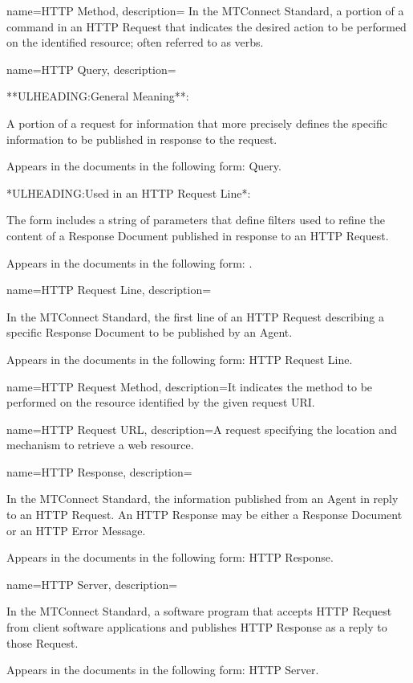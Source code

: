 {
    name={HTTP Method},
	description={
	In the MTConnect Standard, a portion of a command in an \gls{HTTP Request} that indicates the desired action to be performed on the identified resource; often referred to as verbs.
}
}

{
    name={HTTP Query},
	description={
	**ULHEADING:General Meaning**:

	A portion of a request for information that more precisely defines the specific information to be published in response to the request. 

	Appears in the documents in the following form: \gls{Query}.

	*ULHEADING:Used in an \gls{HTTP Request Line}*:

	The form  includes a string of parameters that define filters used to refine the content of a \gls{Response Document} published in response to an \gls{HTTP Request}.

	Appears in the documents in the following form: .
}
}

{
    name={HTTP Request Line},
	description={
	In the MTConnect Standard, the first line of an \gls{HTTP Request} describing a specific \gls{Response Document} to be published by an \gls{Agent}.

	Appears in the documents in the following form: \gls{HTTP Request Line}.
}
}

{
    name={HTTP Request Method},
	description={It indicates the method to be performed on the resource identified by the given request URI.}
}

{
    name={HTTP Request URL},
	description={A request specifying the location and mechanism to retrieve a web resource.}
}

{
    name={HTTP Response},
	description={
	In the MTConnect Standard, the information published from an \gls{Agent} in reply to an \gls{HTTP Request}.  An \gls{HTTP Response} may be either a \gls{Response Document} or an \gls{HTTP Error Message}.

	Appears in the documents in the following form: \gls{HTTP Response}.
}
}

{
    name={HTTP Server},
	description={
	In the MTConnect Standard, a software program that accepts \gls{HTTP Request} from client software applications and publishes \gls{HTTP Response} as a reply to those \gls{Request}.

	Appears in the documents in the following form: \gls{HTTP Server}.
}
}

